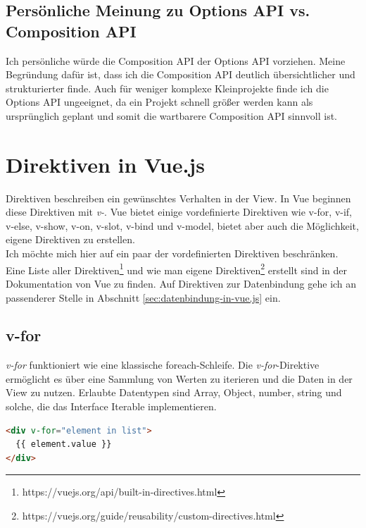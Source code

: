 \subsection*{Persönliche Meinung zu Options API vs. Composition API}
Ich persönliche würde die Composition API der Options API vorziehen.
Meine Begründung dafür ist, dass ich die Composition API deutlich übersichtlicher
und strukturierter finde.
Auch für weniger komplexe Kleinprojekte finde ich die Options API ungeeignet,
da ein Projekt schnell größer werden kann als ursprünglich geplant und somit die
wartbarere Composition API sinnvoll ist.


\section{Direktiven in Vue.js}\label{sec:direktiven-in-vue.js}
Direktiven beschreiben ein gewünschtes Verhalten in der View.
In Vue beginnen diese Direktiven mit \emph{v-}.
Vue bietet einige vordefinierte Direktiven wie v-for, v-if, v-else, v-show, v-on, v-slot, v-bind
und v-model, bietet aber auch die Möglichkeit, eigene Direktiven zu erstellen. \cite[S. 10]{steyer2019}
\\
Ich möchte mich hier auf ein paar der vordefinierten Direktiven beschränken.
Eine Liste aller Direktiven\footnote{https://vuejs.org/api/built-in-directives.html}
und wie man eigene Direktiven\footnote{https://vuejs.org/guide/reusability/custom-directives.html}
erstellt sind in der Dokumentation von Vue zu finden.
Auf Direktiven zur Datenbindung gehe ich an passenderer Stelle in Abschnitt \ref{sec:datenbindung-in-vue.js} ein.


\subsection*{v-for}
\emph{v-for} funktioniert wie eine klassische foreach-Schleife.
Die \emph{v-for}-Direktive ermöglicht es über eine Sammlung von Werten zu iterieren und die Daten in der View zu nutzen.
Erlaubte Datentypen sind Array, Object, number, string und solche, die das Interface Iterable implementieren. \cite{vueDirectives}
\begin{lstlisting}[caption={\emph{v-for}-Direktive},language=html, label={lst:v-for}]
<div v-for="element in list">
  {{ element.value }}
</div>
\end{lstlisting}


